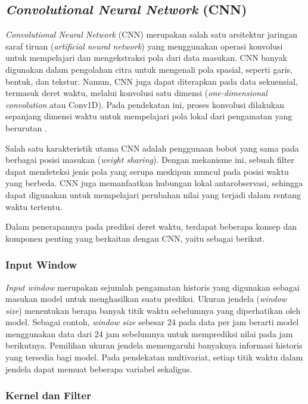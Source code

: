 \documentclass[10pt,conference]{IEEEtran}
\begin{document}
\subsection{\textit{Convolutional Neural Network} (CNN)}

\textit{Convolutional Neural Network} (CNN) merupakan salah satu arsitektur jaringan saraf tiruan (\textit{artificial neural network}) yang menggunakan operasi konvolusi untuk mempelajari dan mengekstraksi pola dari data masukan. CNN banyak digunakan dalam pengolahan citra untuk mengenali pola spasial, seperti garis, bentuk, dan tekstur. Namun, CNN juga dapat diterapkan pada data sekuensial, termasuk deret waktu, melalui konvolusi satu dimensi (\textit{one-dimensional convolution} atau Conv1D). Pada pendekatan ini, proses konvolusi dilakukan sepanjang dimensi waktu untuk mempelajari pola lokal dari pengamatan yang berurutan \cite{conv1d}.

Salah satu karakteristik utama CNN adalah penggunaan bobot yang sama pada berbagai posisi masukan (\textit{weight sharing}). Dengan mekanisme ini, sebuah filter dapat mendeteksi jenis pola yang serupa meskipun muncul pada posisi waktu yang berbeda. CNN juga memanfaatkan hubungan lokal antarobservasi, sehingga dapat digunakan untuk mempelajari perubahan nilai yang terjadi dalam rentang waktu tertentu.

Dalam penerapannya pada prediksi deret waktu, terdapat beberapa konsep dan komponen penting yang berkaitan dengan CNN, yaitu sebagai berikut.

\subsubsection{Input Window}

\textit{Input window} merupakan sejumlah pengamatan historis yang digunakan sebagai masukan model untuk menghasilkan suatu prediksi. Ukuran jendela (\textit{window size}) menentukan berapa banyak titik waktu sebelumnya yang diperhatikan oleh model. Sebagai contoh, \textit{window size} sebesar 24 pada data per jam berarti model menggunakan data dari 24 jam sebelumnya untuk memprediksi nilai pada jam berikutnya. Pemilihan ukuran jendela memengaruhi banyaknya informasi historis yang tersedia bagi model. Pada pendekatan multivariat, setiap titik waktu dalam jendela dapat memuat beberapa variabel sekaligus.

\subsubsection{Kernel dan Filter}
\end{document}

